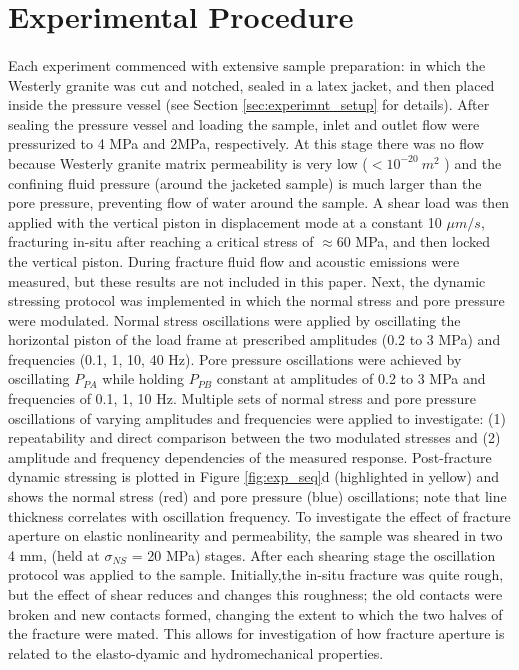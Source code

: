 \documentclass[letterpaper,10pt]{article}
\begin{document}
\newpage


\section{Experimental Procedure}
\paragraph{}
Each experiment commenced with extensive sample preparation: in which the Westerly granite was cut and notched, sealed in a latex jacket, and then placed inside the pressure vessel (see Section \ref{sec:experimnt_setup} for details). After sealing the pressure vessel and loading the sample, inlet and outlet flow were pressurized to 4 MPa and 2MPa, respectively. At this stage there was no flow because Westerly granite matrix permeability is very low ($< 10^{-20}\ m^2$ ) and the confining fluid pressure (around the jacketed sample) is much larger than the pore pressure, preventing flow of water around the sample.
A shear load was then applied with the vertical piston in displacement mode at a constant 10 $\mu m/s$, fracturing in-situ after reaching a critical stress of $ \approx $60 MPa, and then locked the vertical piston. During fracture fluid flow and acoustic emissions were measured, but these results are not included in this paper. Next, the dynamic stressing protocol was implemented in which the normal stress and pore pressure were modulated. Normal stress oscillations were applied by oscillating the horizontal piston of the load frame at prescribed amplitudes (0.2 to 3 MPa) and frequencies (0.1, 1, 10, 40 Hz). Pore pressure oscillations were achieved by oscillating $P_{PA}$ while holding $P_{PB}$ constant at amplitudes of 0.2 to 3 MPa and frequencies of 0.1, 1, 10 Hz. Multiple sets of normal stress and pore pressure oscillations of varying amplitudes and frequencies were applied to investigate: (1) repeatability and direct comparison between the two modulated stresses and (2) amplitude and frequency dependencies of the measured response. Post-fracture dynamic stressing is plotted in Figure \ref{fig:exp_seq}d (highlighted in yellow) and shows the normal stress (red) and pore pressure (blue) oscillations; note that line thickness correlates with oscillation frequency. 
To investigate the effect of fracture aperture on elastic nonlinearity and permeability, the sample was sheared in two 4 mm, (held at $ \sigma_{NS} $ = 20 MPa) stages. After each shearing stage the oscillation protocol was applied to the sample. Initially,the in-situ fracture was quite rough, but the effect of shear reduces and changes this roughness; the old contacts were broken and new contacts formed, changing the extent to which the two halves of the fracture were mated. This allows for investigation of how fracture aperture is related to the elasto-dyamic and hydromechanical properties. 
\end{document}
